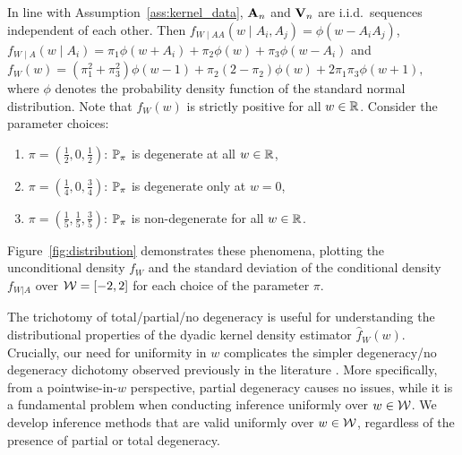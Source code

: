 In line with Assumption~\ref{ass:kernel_data}, $\bA_n$ and $\bV_n$ are i.i.d.\
sequences independent of each other. Then
$f_{W \mid AA}(w \mid A_i, A_j) = \phi(w - A_i A_j)$,\,
$f_{W \mid A}(w \mid A_i) = \pi_1 \phi(w + A_i) + \pi_2 \phi(w)
+ \pi_3 \phi(w - A_i)$ and
$f_W(w) = (\pi_1^2 + \pi_3^2) \phi(w-1) + \pi_2 (2 - \pi_2) \phi(w) + 2
\pi_1 \pi_3 \phi(w+1),$
where $\phi$ denotes the probability density function of the standard normal
distribution. Note that $f_W(w)$ is strictly positive for all $w \in \R$.
Consider the parameter choices:
%
\begin{enumerate}[label=(\roman*)]

  \item $\pi = \left( \frac{1}{2}, 0, \frac{1}{2} \right)$:\quad
    $\P_\pi$ is degenerate at all $w \in \R$,

  \item $\pi = \left( \frac{1}{4}, 0, \frac{3}{4} \right)$:\quad
    $\P_\pi$ is degenerate only at $w=0$,

  \item $\pi = \left( \frac{1}{5}, \frac{1}{5}, \frac{3}{5} \right)$:\quad
    $\P_\pi$ is non-degenerate for all $w \in \R$.

\end{enumerate}
%
Figure~\ref{fig:distribution} demonstrates these phenomena, plotting the
unconditional density $f_W$ and the standard deviation of the conditional
density $f_{W|A}$ over $\cW = [-2,2]$ for each choice of the parameter $\pi$.

The trichotomy of total/partial/no  degeneracy is useful for understanding the
distributional properties of the dyadic kernel density estimator
$\hat{f}_W(w)$. Crucially, our need for uniformity in $w$ complicates the
simpler degeneracy/no degeneracy dichotomy observed previously in the
literature \citep{graham2022kernel}. More specifically, from a pointwise-in-$w$
perspective, partial degeneracy causes no issues, while it is a fundamental
problem when conducting inference uniformly over $w \in \cW$. We develop
inference methods that are valid uniformly over $w \in \cW$, regardless of the
presence of partial or total degeneracy.

